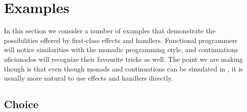 \section{Examples}
\label{sec:examples}

In this section we consider a number of examples that demonstrate the possibilities offered by first-class effects and handlers. Functional programmers will notice similarities with the monadic programming style, and continuations aficionados will recognize their favourite tricks as well. The point we are making though is that even though monads and continuations can be simulated in \eff, it is usually more natural to use effects and handlers directly.

\subsection{Choice}
\label{sec:choice}

